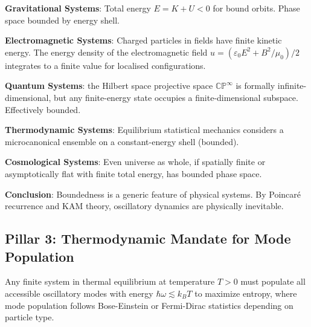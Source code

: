 \documentclass[11pt,onecolumn]{article}
\begin{document}
\textbf{Gravitational Systems}: Total energy $E = K + U < 0$ for bound orbits. Phase space bounded by energy shell.

\textbf{Electromagnetic Systems}: Charged particles in fields have finite kinetic energy. The energy density of the electromagnetic field $u = (\varepsilon_0 E^2 + B^2/\mu_0)/2$ integrates to a finite value for localised configurations.

\textbf{Quantum Systems}: the Hilbert space projective space $\mathbb{CP}^{\infty}$ is formally infinite-dimensional, but any finite-energy state occupies a finite-dimensional subspace. Effectively bounded.

\textbf{Thermodynamic Systems}: Equilibrium statistical mechanics considers a microcanonical ensemble on a constant-energy shell (bounded).

\textbf{Cosmological Systems}: Even universe as whole, if spatially finite or asymptotically flat with finite total energy, has bounded phase space.

\textbf{Conclusion}: Boundedness is a generic feature of physical systems. By Poincar\'e recurrence and KAM theory, oscillatory dynamics are physically inevitable.

\subsection{Pillar 3: Thermodynamic Mandate for Mode Population}

\begin{theorem}
\label{thm:mode_completeness}
Any finite system in thermal equilibrium at temperature $T > 0$ must populate all accessible oscillatory modes with energy $\hbar \omega \lesssim k_B T$ to maximize entropy, where mode population follows Bose-Einstein or Fermi-Dirac statistics depending on particle type.
\end{theorem}
\end{document}
